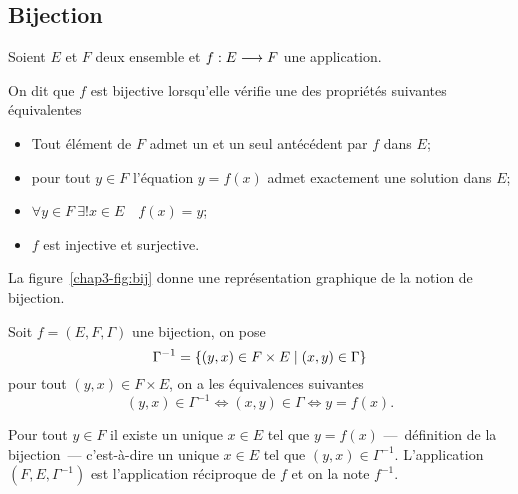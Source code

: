 \subsection{Bijection}
\label{chap3-subsubsec:bijection}
Soient \(E\) et \(F\) deux ensemble et \(f:E \longrightarrow F\) une application.
\begin{defdef}
    On dit que \(f\) est bijective lorsqu'elle vérifie une des propriétés 
    suivantes équivalentes
    \begin{itemize}
        \item Tout élément de \(F\) admet un et un seul antécédent par \(f\) 
            dans \(E\);
        \item pour tout \(y \in F\) l'équation \(y=f(x)\) admet exactement une 
            solution dans \(E\);
        \item \(\forall y \in F \ \exists! x \in E \quad f(x)=y\);
        \item \(f\) est injective et surjective.
    \end{itemize}
    La figure~\ref{chap3-fig:bij} donne une représentation graphique de la 
    notion de bijection.
\end{defdef}
%
Soit \(f=(E,F,\Gamma)\) une bijection, on pose 
\begin{equation}
    \Gamma^{-1}=\left\{(y,x) \in F \times E\mathrel{}\middle|\mathrel{}(x,y) \in \Gamma\right\}
\end{equation}
pour tout \((y,x) \in F \times E\), on a les équivalences suivantes
\begin{equation}
    (y,x) \in \Gamma^{-1} \iff (x,y) \in \Gamma \iff y=f(x).
\end{equation}

Pour tout \(y \in F\) il existe un unique \(x \in E\) tel que \(y=f(x)\) 
---~définition de la bijection~--- c'est-à-dire un unique \(x \in E\) tel que 
\((y,x) \in \Gamma^{-1}\). L'application \((F,E,\Gamma^{-1})\) est l'application 
réciproque de \(f\) et on la note \(f^{-1}\).

